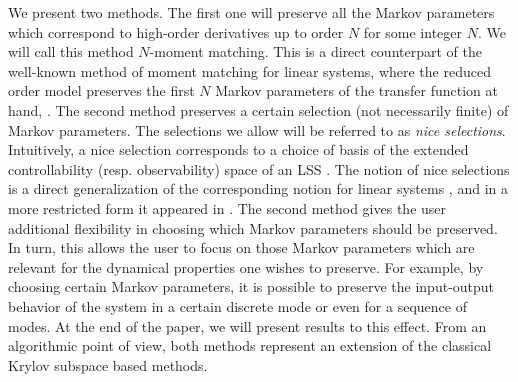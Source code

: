 \documentclass[journal]{IEEEtran}
\begin{document}
We present two methods. The first one will preserve all the Markov parameters which correspond to high-order derivatives up to order $N$ for some integer $N$. We will call this method $N$-moment matching. This is a direct counterpart of the well-known method of moment matching for linear systems, where the  reduced order model preserves the first $N$ Markov parameters of the transfer function at hand, \cite{antoulas}. The second method preserves a certain selection (not necessarily finite) of Markov parameters. The selections we allow will be referred to as \emph{nice selections}. Intuitively, a nice selection corresponds to a choice of basis of the extended controllability (resp. observability) space of an LSS \cite{Sun:Book,MP:BigArticlePartI}. The notion of nice selections is a direct generalization of the corresponding notion for linear systems \cite{Hazewinkel1,gugercin}, and in a more restricted form it appeared in \cite{petreczkypeeters1}. The second method gives the user additional flexibility in choosing
which Markov parameters should be preserved. In turn, this allows the user to focus on those Markov parameters which are relevant for the dynamical properties one wishes to preserve. For example, by choosing certain Markov parameters, it is possible to preserve the input-output behavior of the system in a certain discrete mode or even for a sequence of modes. At the end of the paper, we will present results to this effect. 
From an algorithmic point of view, both methods represent an extension of the classical Krylov subspace  based methods. 
\end{document}
